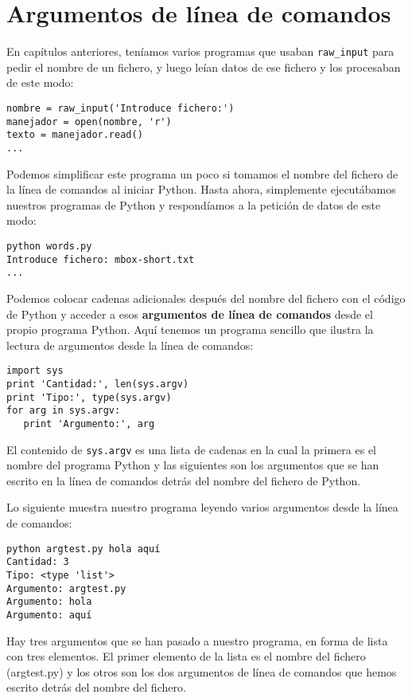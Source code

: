 \section{Argumentos de línea de comandos}


En capítulos anteriores, teníamos varios programas que usaban
\verb"raw_input" para pedir el nombre de un fichero, y luego leían datos
de ese fichero y los procesaban de este modo:

\beforeverb
\begin{verbatim}
nombre = raw_input('Introduce fichero:')
manejador = open(nombre, 'r')
texto = manejador.read()
...
\end{verbatim}
\afterverb
%
Podemos simplificar este programa un poco si tomamos el nombre del fichero
de la línea de comandos al iniciar Python. Hasta ahora,
simplemente ejecutábamos nuestros programas de Python y respondíamos
a la petición de datos de este modo:

\beforeverb
\begin{verbatim}
python words.py
Introduce fichero: mbox-short.txt
...
\end{verbatim}
\afterverb
%
Podemos colocar cadenas adicionales después del nombre del fichero con el código de Python y
acceder a esos {\bf argumentos de línea de comandos} desde el propio programa Python.
Aquí tenemos un programa sencillo que ilustra la lectura de argumentos desde la línea de
comandos:

\beforeverb
\begin{verbatim}
import sys
print 'Cantidad:', len(sys.argv)
print 'Tipo:', type(sys.argv)
for arg in sys.argv:
   print 'Argumento:', arg
\end{verbatim}
\afterverb
%
El contenido de {\tt sys.argv} es una lista de cadenas en la cual la primera
es el nombre del programa Python y las siguientes son los argumentos que se han
escrito en la línea de comandos detrás del nombre del fichero de Python.

Lo siguiente muestra nuestro programa leyendo varios argumentos desde la línea de
comandos:

\beforeverb
\begin{verbatim}
python argtest.py hola aquí
Cantidad: 3
Tipo: <type 'list'>
Argumento: argtest.py
Argumento: hola
Argumento: aquí
\end{verbatim}
\afterverb
%
Hay tres argumentos que se han pasado a nuestro programa, en forma de lista con tres elementos.
El primer elemento de la lista es el nombre del fichero (argtest.py) y los otros son
los dos argumentos de línea de comandos que hemos escrito detrás del nombre del fichero.

